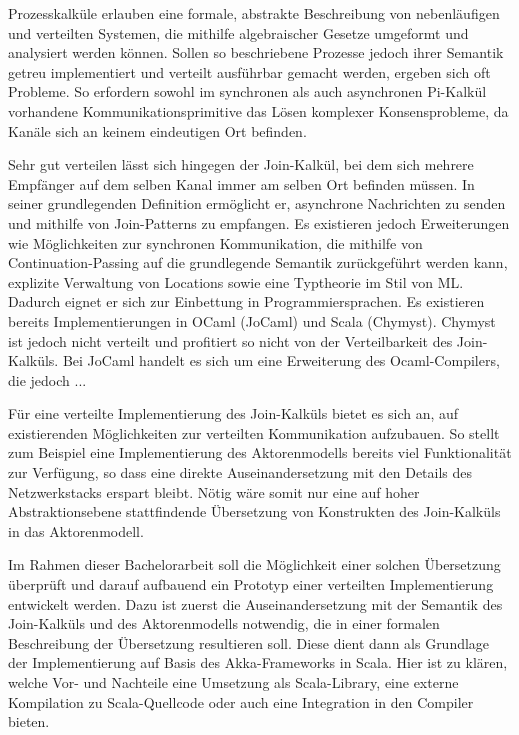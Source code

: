 \documentclass[12pt]{article}
\begin{document}
\maketitle

Prozesskalküle erlauben eine formale, abstrakte Beschreibung von nebenläufigen und verteilten Systemen, die mithilfe algebraischer Gesetze umgeformt und analysiert werden können.
Sollen so beschriebene Prozesse jedoch ihrer Semantik getreu implementiert und verteilt ausführbar gemacht werden, ergeben sich oft Probleme.
So erfordern sowohl im synchronen als auch asynchronen Pi-Kalkül vorhandene Kommunikationsprimitive das Lösen komplexer Konsensprobleme, da Kanäle sich an keinem eindeutigen Ort befinden.

Sehr gut verteilen lässt sich hingegen der Join-Kalkül, bei dem sich mehrere Empfänger auf dem selben Kanal immer am selben Ort befinden müssen.
In seiner grundlegenden Definition ermöglicht er, asynchrone Nachrichten zu senden und mithilfe von Join-Patterns zu empfangen.
Es existieren jedoch Erweiterungen wie Möglichkeiten zur synchronen Kommunikation, die mithilfe von Continuation-Passing auf die grundlegende Semantik zurückgeführt werden kann, explizite Verwaltung von Locations sowie eine Typtheorie im Stil von ML.
Dadurch eignet er sich zur Einbettung in Programmiersprachen. Es existieren bereits Implementierungen in OCaml (JoCaml) und Scala (Chymyst). Chymyst ist jedoch nicht verteilt und profitiert so nicht von der Verteilbarkeit des Join-Kalküls. Bei JoCaml handelt es sich um eine Erweiterung des Ocaml-Compilers, die jedoch ...

Für eine verteilte Implementierung des Join-Kalküls bietet es sich an, auf existierenden Möglichkeiten zur verteilten Kommunikation aufzubauen.
So stellt zum Beispiel eine Implementierung des Aktorenmodells bereits viel Funktionalität zur Verfügung, so dass eine direkte Auseinandersetzung mit den Details des Netzwerkstacks erspart bleibt.
Nötig wäre somit nur eine auf hoher Abstraktionsebene stattfindende Übersetzung von Konstrukten des Join-Kalküls in das Aktorenmodell.

Im Rahmen dieser Bachelorarbeit soll die Möglichkeit einer solchen Übersetzung überprüft und darauf aufbauend ein Prototyp einer verteilten Implementierung entwickelt werden.
Dazu ist zuerst die Auseinandersetzung mit der Semantik des Join-Kalküls und des Aktorenmodells notwendig, die in einer formalen Beschreibung der Übersetzung resultieren soll.
Diese dient dann als Grundlage der Implementierung auf Basis des Akka-Frameworks in Scala.
Hier ist zu klären, welche Vor- und Nachteile eine Umsetzung als Scala-Library, eine externe Kompilation zu Scala-Quellcode oder auch eine Integration in den Compiler bieten.
\end{document}

